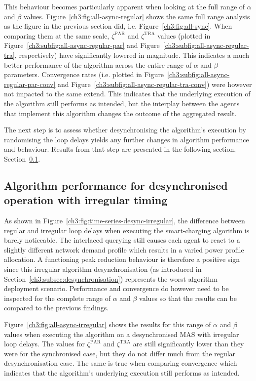 

This behaviour becomes particularly apparent when looking at the full range of $\alpha$ and $\beta$ values.
Figure~\ref{ch3:fig:all-async-regular} shows the same full range analysis as the figure in the previous section did, i.e. Figure~\ref{ch3:fig:all-sync}.
When comparing them at the same scale, $\zeta^\text{PAR}$ and $\zeta^\text{TRA}$ values (plotted in Figure~\ref{ch3:subfig:all-async-regular-par} and Figure~\ref{ch3:subfig:all-async-regular-tra}, respectively) have significantly lowered in magnitude.
This indicates a much better performance of the algorithm across the entire range of $\alpha$ and $\beta$ parameters.
Convergence rates (i.e. plotted in Figure~\ref{ch3:subfig:all-async-regular-par-conv} and Figure~\ref{ch3:subfig:all-async-regular-tra-conv}) were however not impacted to the same extend.
This indicates that the underlying execution of the algorithm still performs as intended, but the interplay between the agents that implement this algorithm changes the outcome of the aggregated result.

The next step is to assess whether desynchronising the algorithm's execution by randomising the loop delays yields any further changes in algorithm performance and behaviour.
Results from that step are presented in the following section, Section~\ref{ch3:subsec:algorithm-performance-desynchronised-irregular}.

\subsection{Algorithm performance for desynchronised operation with irregular timing}
\label{ch3:subsec:algorithm-performance-desynchronised-irregular}



As shown in Figure~\ref{ch3:fig:time-series-desync-irregular}, the difference between regular and irregular loop delays when executing the smart-charging algorithm is barely noticeable.
The interlaced querying still causes each agent to react to a slightly different network demand profile which results in a varied power profile allocation.
A functioning peak reduction behaviour is therefore a positive sign since this irregular algorithm desynchronisation (as introduced in Section~\ref{ch3:subsec:desynchronisation}) represents the worst algorithm deployment scenario.
Performance and convergence do however need to be inspected for the complete range of $\alpha$ and $\beta$ values so that the results can be compared to the previous findings.



Figure~\ref{ch3:fig:all-async-irregular} shows the results for this range of $\alpha$ and $\beta$ values when executing the algorithm on a desynchronised MAS with irregular loop delays.
The values for $\zeta^\text{PAR}$ and $\zeta^\text{TRA}$ are still significantly lower than they were for the synchronised case, but they do not differ much from the regular desynchronisation case.
The same is true when comparing convergence which indicates that the algorithm's underlying execution still performs as intended.
